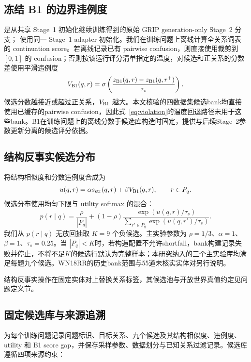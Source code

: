 \subsection{冻结 B1 的边界违例度}

\bone{} 是从共享 Stage~1 初始化继续训练得到的原始 GRIP generation-only Stage~2 分支；\scc{} 使用同一 Stage~1 adapter 初始化。我们在训练问题上离线计算全关系词表的 continuation score。若离线记录已有 pairwise confusion，则直接使用裁剪到 $[0,1]$ 的 confusion；否则按该运行评分清单指定的温度，对候选和正关系的分数差使用平滑违例度
\begin{equation}
    V_{\textsc{B1}}(q,r)=\sigma\left(\frac{z_{\textsc{B1}}(q,r)-z_{\textsc{B1}}(q,r^+)}{\tau_v}\right).
    \label{eq:violation}
\end{equation}
候选分数越接近或超过正关系，$V_{\textsc{B1}}$ 越大。本文核验的四数据集候选bank均直接使用已缓存的pairwise confusion，因此式~\ref{eq:violation}的温度回退路径未用于这些bank。B1在训练问题上的离线分数于候选库构造时固定，提供与后续Stage~2参数更新分离的候选评分依据。

\subsection{结构反事实候选分布}

将结构相似度和分数违例度合成为
\begin{equation}
    u(q,r)=\alpha s_{\mathrm{str}}(q,r)+\beta V_{\textsc{B1}}(q,r),
    \qquad r\in P_q.
    \label{eq:utility}
\end{equation}
候选分布使用均匀下限与 utility softmax 的混合：
\begin{equation}
    p(r\mid q)=\frac{\rho}{|P_q|}+(1-\rho)
    \frac{\exp(u(q,r)/\tau_s)}{\sum_{r'\in P_q}\exp(u(q,r')/\tau_s)}.
    \label{eq:sampling}
\end{equation}
我们从 $p(r\mid q)$ 无放回抽取 $K=9$ 个负候选。主实验参数为 $\rho=1/3$、$\alpha=1$、$\beta=1$、$\tau_s=0.25$。当 $|P_q|<K$时，若构造配置不允许shortfall，bank构建记录失败并停止，不将不足$K$的候选行默认为完整样本；本研究纳入的三个主实验库均满足每题九个候选。WN18RR的历史bank范围与55道未核实实体对另行说明。

结构反事实操作在固定实体对上替换关系标签，其候选池与开放世界真值约定见问题定义节。

\subsection{固定候选库与来源追溯}

\scc{} 为每个训练问题记录问题标识、目标关系、九个候选及其结构相似度、违例度、utility 和 B1 score gap，并保存采样参数、数据划分与已知关系过滤记录。候选库遵循四项来源约束：

